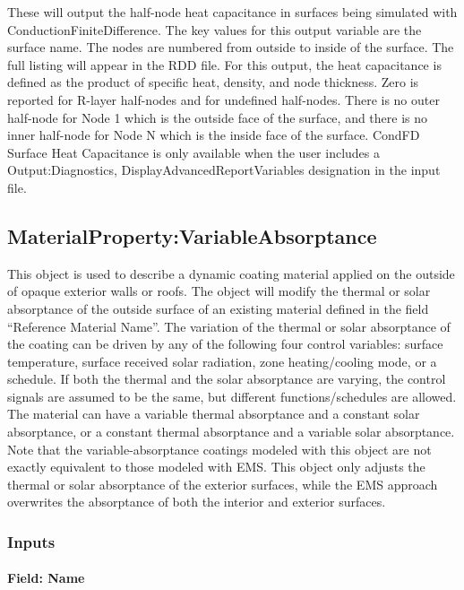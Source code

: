 These will output the half-node heat capacitance in surfaces being simulated with ConductionFiniteDifference. The key values for this output variable are the surface name. The nodes are numbered from outside to inside of the surface. The full listing will appear in the RDD file. For this output, the heat capacitance is defined as the product of specific heat, density, and node thickness. Zero is reported for R-layer half-nodes and for undefined half-nodes. There is no outer half-node for Node 1 which is the outside face of the surface, and there is no inner half-node for Node N which is the inside face of the surface. CondFD Surface Heat Capacitance is only available when the user includes a Output:Diagnostics, DisplayAdvancedReportVariables designation in the input file.

\subsection{MaterialProperty:VariableAbsorptance}\label{materialpropertyvariableabsorptance}

This object is used to describe a dynamic coating material applied on the
outside of opaque exterior walls or roofs. The object will modify the thermal
or solar absorptance of the outside surface of an existing material defined in
the field ``Reference Material Name''. The variation of the thermal or solar
absorptance of the coating can be driven by any of the following four control
variables: surface temperature, surface received solar radiation, zone
heating/cooling mode, or a schedule. If both the thermal and the solar
absorptance are varying, the control signals are assumed to be the same, but
different functions/schedules are allowed. The material can have a variable
thermal absorptance and a constant solar absorptance, or a constant thermal
absorptance and a variable solar absorptance. Note that the variable-absorptance
coatings modeled with this object are not exactly equivalent to those modeled
with EMS. This object only adjusts the thermal or solar absorptance of the
exterior surfaces, while the EMS approach overwrites the absorptance of both the
interior and exterior surfaces.

\subsubsection{Inputs}\label{inputs-materialpropertyvariableabsorptance}

\paragraph{Field: Name}\label{field-name-materialpropertyvariableabsorptance}

